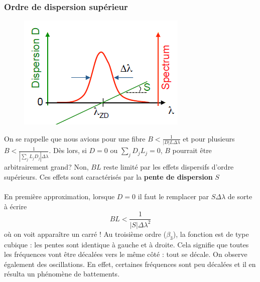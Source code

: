 	\subsubsection{Ordre de dispersion supérieur}
	\begin{figure}
	\vspace{-7mm}
	\includegraphics[scale=0.5]{ch1/image38}
	\end{figure}
	On se rappelle que nous avions pour une fibre $B < \frac{1}{{\left| D \right|L\Delta \lambda }}$
	et pour plusieurs $B < \frac{1}{{\left| {\sum\nolimits_j {{L_j}{D_j}} } \right|\Delta \lambda }}$.
	Dès lors, si $D=0$ ou $\sum\limits_j {{D_j}{L_j}}  = 0$, $B$ pourrait être arbitrairement grand?
	Non, $BL$ reste limité par les effets dispersifs d'ordre supérieurs. Ces effets sont caractérisés
	par la \textbf{pente de dispersion} $S$\\
	
	\ \\
	
	En première approximation, lorsque $D=0$ il faut le remplacer par $S\Delta \lambda$ de sorte à 
	écrire
	\begin{equation}
	BL < \frac{1}{{\left| S \right|\Delta {\lambda ^2}}}
	\end{equation}
	où on voit apparaître un carré ! Au troisième ordre ($\beta_3$), la fonction est de type cubique :
	les pentes sont identique à gauche et à droite. Cela signifie que toutes les fréquences vont
	être décalées vers le même côté : tout se décale. On observe également des oscillations. En effet,
	certaines fréquences sont peu décalées et il en résulta un phénomène de battements.\\
	
